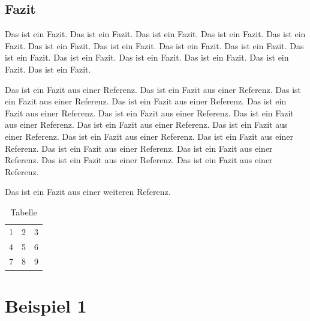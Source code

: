 \subsection{Fazit}
Das ist ein Fazit. Das ist ein Fazit. Das ist ein Fazit. Das ist ein Fazit. Das ist ein Fazit. Das ist ein Fazit. Das ist ein Fazit. Das ist ein Fazit. Das ist ein Fazit. Das ist ein Fazit. Das ist ein Fazit. Das ist ein Fazit. Das ist ein Fazit. Das ist ein Fazit. Das ist ein Fazit.

Das ist ein Fazit aus einer Referenz. Das ist ein Fazit aus einer Referenz. Das ist ein Fazit aus einer Referenz. Das ist ein Fazit aus einer Referenz. Das ist ein Fazit aus einer Referenz. Das ist ein Fazit aus einer Referenz. Das ist ein Fazit aus einer Referenz. Das ist ein Fazit aus einer Referenz. Das ist ein Fazit aus einer Referenz. Das ist ein Fazit aus einer Referenz. Das ist ein Fazit aus einer Referenz. Das ist ein Fazit aus einer Referenz. Das ist ein Fazit aus einer Referenz. Das ist ein Fazit aus einer Referenz. Das ist ein Fazit aus einer Referenz. \cite{Reference:00}

Das ist ein Fazit aus einer weiteren Referenz. \cite{Reference:01}

\begin{table}
	\centering
	\begin{tabular}{| l c r |}
		\hline
		1 & 2 & 3 \\
		4 & 5 & 6 \\
		7 & 8 & 9 \\
		\hline
	\end{tabular}
	\caption{Tabelle}
\end{table}

\section{Beispiel 1}

